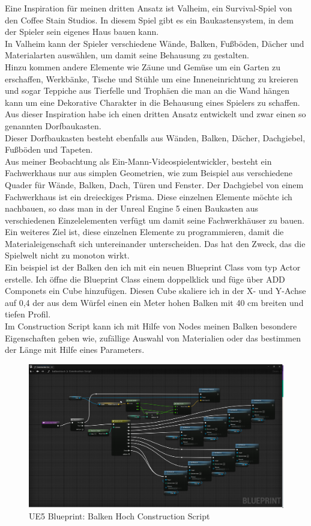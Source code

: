 Eine Inspiration für meinen dritten Ansatz ist Valheim, ein Survival-Spiel von den Coffee Stain Studios. In diesem Spiel gibt es ein Baukastensystem, in dem der Spieler sein eigenes Haus bauen kann.
\\
In Valheim kann der Spieler verschiedene Wände, Balken, Fußböden, Dächer und Materialarten auswählen, um damit seine Behausung zu gestalten.
\\
Hinzu kommen andere Elemente wie Zäune und Gemüse um ein Garten zu erschaffen, Werkbänke, Tische und Stühle um eine Inneneinrichtung zu kreieren und sogar Teppiche aus Tierfelle und Trophäen die man an die Wand hängen kann um eine Dekorative Charakter in die Behausung eines Spielers zu schaffen.
\\
Aus dieser Inspiration habe ich einen dritten Ansatz entwickelt und zwar einen so genannten Dorfbaukasten.
\\
Dieser Dorfbaukasten besteht ebenfalls aus Wänden, Balken, Dächer, Dachgiebel, Fußböden und Tapeten.
\\
Aus meiner Beobachtung als Ein-Mann-Videospielentwickler, besteht ein Fachwerkhaus nur aus simplen Geometrien, wie zum Beispiel aus verschiedene Quader für Wände, Balken, Dach, Türen und Fenster. Der Dachgiebel von einem Fachwerkhaus ist ein dreieckiges Prisma. Diese einzelnen Elemente möchte ich nachbauen, so dass man in der Unreal Engine 5 einen Baukasten aus verschiedenen Einzelelementen verfügt um damit seine Fachwerkhäuser zu bauen. 
\\
Ein weiteres Ziel ist, diese einzelnen Elemente zu programmieren, damit die Materialeigenschaft sich untereinander unterscheiden. Das hat den Zweck, das die Spielwelt nicht zu monoton wirkt.
\\
Ein beispiel ist der Balken den ich mit ein neuen Blueprint Class vom typ Actor erstelle. Ich öffne die Blueprint Class einem doppelklick und füge über ADD Componets ein Cube hinzufügen. Diesen Cube skaliere ich in der X- und Y-Achse auf 0,4 der aus dem Würfel einen ein Meter hohen Balken mit 40 cm breiten und tiefen Profil.
\\
Im Construction Script kann ich mit Hilfe von Nodes meinen Balken besondere Eigenschaften geben wie, zufällige Auswahl von Materialien oder das bestimmen der Länge mit Hilfe eines Parameters.
\\
\begin{figure}
	\includegraphics[width=14cm]{BilderFuerBA/Screenshot/UE5/balkenHochBP.png}
	\caption{UE5 Blueprint: Balken Hoch Construction Script}
	\label{UE5balkenHochBP}
\end{figure}

